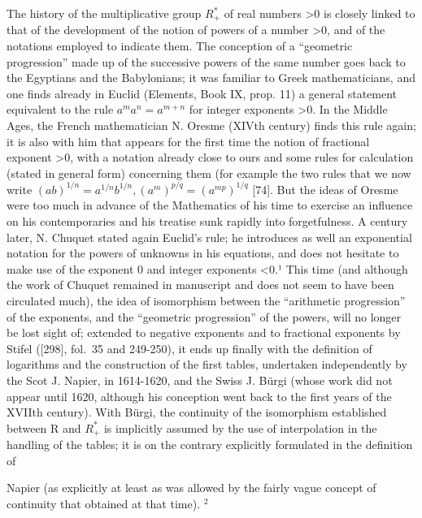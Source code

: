 The history of the multiplicative group \(R_{+}^{*}\) of real numbers \textgreater0 is closely linked to that of the development of the notion of powers of a number \textgreater0, and of the notations employed to indicate them. The conception of a ``geometric progression'' made up of the successive powers of the same number goes back to the Egyptians and the Babylonians; it was familiar to Greek mathematicians, and one finds already in Euclid (Elements, Book IX, prop. 11) a general statement equivalent to the rule \(a^{m}a^{n}=a^{m+n}\) for integer exponents \textgreater0. In the Middle Ages, the French mathematician N. Oresme (XIVth century) finds this rule again; it is also with him that appears for the first time the notion of fractional exponent \textgreater0, with a notation already close to ours and some rules for calculation (stated in general form) concerning them (for example the two rules that we now write \((ab)^{1/n}=a^{1/n}b^{1/n},(a^{m})^{p/q}=(a^{mp})^{1/q}\) {[}74{]}. But the ideas of Oresme were too much in advance of the Mathematics of his time to exercise an influence on his contemporaries and his treatise sunk rapidly into forgetfulness. A century later, N. Chuquet stated again Euclid's rule; he introduces as well an exponential notation for the powers of unknowns in his equations, and does not hesitate to make use of the exponent 0 and integer exponents \textless0.¹ This time (and although the work of Chuquet remained in manuscript and does not seem to have been circulated much), the idea of isomorphism between the ``arithmetic progression'' of the exponents, and the ``geometric progression'' of the powers, will no longer be lost sight of; extended to negative exponents and to fractional exponents by Stifel ({[}298{]}, fol.~35 and 249-250), it ends up finally with the definition of logarithms and the construction of the first tables, undertaken independently by the Scot J. Napier, in 1614-1620, and the Swiss J. Bürgi (whose work did not appear until 1620, although his conception went back to the first years of the XVIIth century). With Bürgi, the continuity of the isomorphism established between R and \(R_{+}^{*}\) is implicitly assumed by the use of interpolation in the handling of the tables; it is on the contrary explicitly formulated in the definition of

Napier (as explicitly at least as was allowed by the fairly vague concept of continuity that obtained at that time). \(^{2}\)

